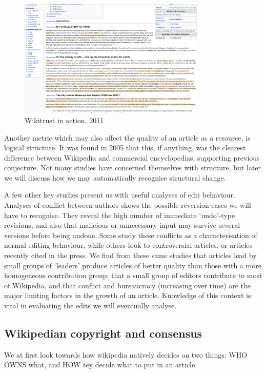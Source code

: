 \begin{figure}
  \centering
  \includegraphics[width=0.8\textwidth,clip=true,resolution=300]{img/wikitrust.png}
  \caption{Wikitrust in action, 2011}
  \label{fig:wikitrust}
\end{figure}

Another metric which may also affect the quality of an article as a
resource, is logical structure. It was found in 2005 that this, if
anything, was the clearest difference between Wikipedia and commercial
encyclopedias,\cite{Giles2005} supporting previous
conjecture.\cite{Denning2005} Not many studies have concerned
themselves with structure, but later we will discuss how we may
automatically recognise structural change.

A few other key studies present us with useful analyses of edit
behaviour. Analyses of conflict between authors shows the possible
reversion cases we will have to recognise. They reveal the high number
of immediate `undo'-type revisions, and also that malicious or
unnecessary input may survive several versions before being
undone. Some study these conflicts as a characterisation of normal
editing
behaviour,\cite{Kittur2007}\cite{Kittur2009}\cite{Kittur2010}\cite{Potthast2008}
while others look to controversial articles,\cite{Iba2010} or articles
recently cited in the press.\cite{Lih2004} We find from these same
studies that articles lead by small groups of `leaders' produce
articles of better quality than those with a more homogeneous
contribution group, that a small group of editors contribute to most
of Wikipedia, and that conflict and bureaucracy (increasing over time)
are the major limiting factors in the growth of an
article.\cite{Suh2009} Knowledge of this context is vital in
evaluating the edits we will eventually analyse.

\subsection*{Wikipedian copyright and consensus}
We at first look towards how wikipedia natively decides on two things:
WHO OWNS what, and HOW tey decide what to put in an article.

